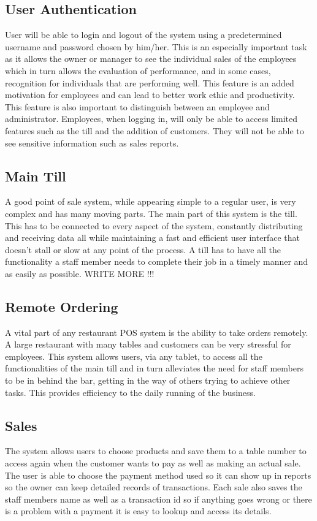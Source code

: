 \subsection{User Authentication}
User will be able to login and logout of the system using a predetermined username and password chosen by him/her. This is an especially important task as it allows the owner or manager to see the individual sales of the employees which in turn allows the evaluation of performance, and in some cases, recognition for individuals that are performing well. This feature is an added motivation for employees and can lead to better work ethic and productivity.
This feature is also important to distinguish between an employee and administrator. Employees, when logging in, will only be able to access limited features such as the till and the addition of customers. They will not be able to see sensitive information such as sales reports.

\subsection{Main Till}
A good point of sale system, while appearing simple to a regular user, is very complex and has many moving parts. The main part of this system is the till. This has to be connected to every aspect of the system, constantly distributing and receiving data all while maintaining a fast and efficient user interface that doesn’t stall or slow at any point of the process.
A till has to have all the functionality a staff member needs to complete their job in a timely manner and as easily as possible. WRITE MORE !!!

\subsection{Remote Ordering}
A vital part of any restaurant POS system is the ability to take orders remotely. A large restaurant with many tables and customers can be very stressful for employees. This system allows users, via any tablet, to access all the functionalities of the main till and in turn alleviates the need for staff members to be in behind the bar, getting in the way of others trying to achieve other tasks. This provides efficiency to the daily running of the business.

\subsection{Sales}
The system allows users to choose products and save them to a table number to access again when the customer wants to pay as well as making an actual sale. The user is able to choose the payment method used so it can show up in reports so the owner can keep detailed records of transactions. Each sale also saves the staff members name as well as a transaction id so if anything goes wrong or there is a problem with a payment it is easy to lookup and access its details.

